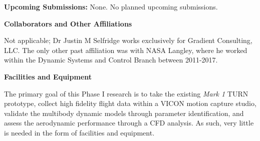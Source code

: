 \documentclass[11pt]{article}
\begin{document}
{\bf Upcoming Submissions:} None. No planned upcoming submissions.








\newpage
{\bf \Huge Collaborators and Other Affiliations}

Not applicable; Dr Justin M Selfridge works exclusively for Gradient Consulting, LLC.  The only other past affiliation was with NASA Langley, where he worked within the Dynamic Systems and Control Branch between 2011-2017.








\newpage
{\bf \Huge Facilities and Equipment}

The primary goal of this Phase I research is to take the existing \emph{Mark 1} TURN prototype, collect high fidelity flight data within a VICON motion capture studio, validate the multibody dynamic models through parameter identification, and assess the aerodynamic performance through a CFD analysis.  As such, very little is needed in the form of facilities and equipment.
\end{document}
